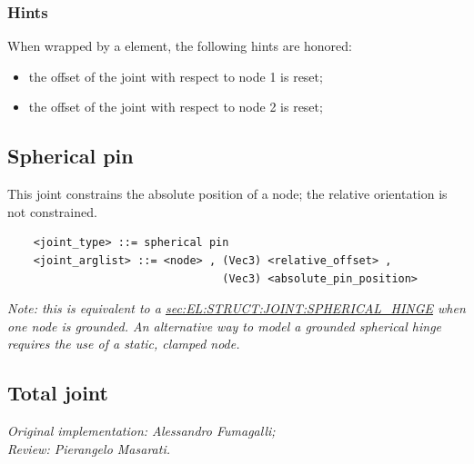 \subsubsection{Hints}
When wrapped by a  element, the following hints are honored:
\begin{itemize}
\item {} the offset of the joint
with respect to node 1 is reset;
\item {} the offset of the joint
with respect to node 2 is reset;
\end{itemize}

\subsection{Spherical pin}
This joint constrains the absolute position of a node;
the relative orientation is not constrained.
\begin{verbatim}
    <joint_type> ::= spherical pin
    <joint_arglist> ::= <node> , (Vec3) <relative_offset> ,
                                 (Vec3) <absolute_pin_position>
\end{verbatim}
{\em
	Note: this is equivalent to a
	\hyperref{\kw{spherical hinge}}{\kw{spherical hinge} (see Section~}{)}{sec:EL:STRUCT:JOINT:SPHERICAL_HINGE}
	when one node is grounded.
	An alternative way to model a grounded spherical hinge requires
	the use of a static, clamped node.
}

\subsection{Total joint}
\label{sec:EL:STRUCT:JOINT:TOTAL_JOINT}
\emph{Original implementation: Alessandro Fumagalli; \\
Review: Pierangelo Masarati.}

